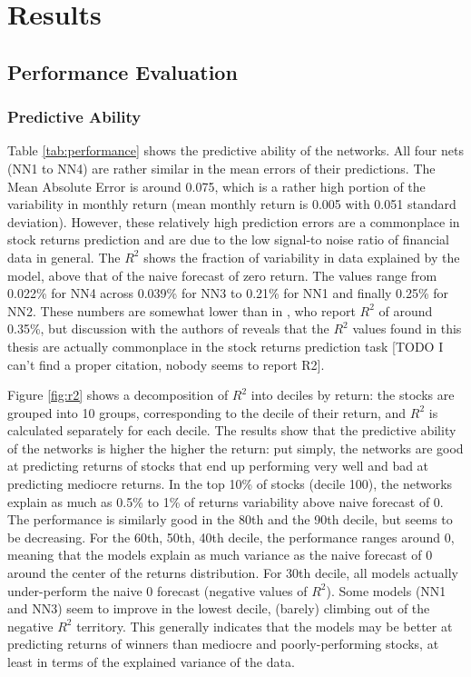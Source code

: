 \chapter{Results}
\label{chap:res}

\section{Performance Evaluation}
	
	\subsection{Predictive Ability}
	
		Table \ref{tab:performance} shows the predictive ability of the networks. All four nets (NN1 to NN4) are rather similar in the mean errors of their predictions. The Mean Absolute Error is around 0.075, which is a rather high portion of the variability in monthly return (mean monthly return is 0.005 with 0.051 standard deviation).  However, these relatively high prediction errors are a commonplace in stock returns prediction and are due to the low signal-to noise ratio of financial data in general. The $R^2$ shows the fraction of variability in data explained by the model, above that of the naive forecast of zero return. The values range from 0.022\% for NN4 across 0.039\% for NN3 to 0.21\% for NN1 and finally 0.25\% for NN2. These numbers are somewhat lower than in \cite{gu2020empirical}, who report $R^2$ of around 0.35\%, but discussion with the authors of \cite{tobek2020does} reveals that the $R^2$ values found in this thesis are actually commonplace in the stock returns prediction task [TODO I can't find a proper citation, nobody seems to report R2].    
		
		Figure \ref{fig:r2} shows a decomposition of $R^2$ into deciles by return: the stocks are grouped into 10 groups, corresponding to the decile of their return, and $R^2$ is calculated separately for each decile. The results show that the predictive ability of the networks is higher the higher the return: put simply, the networks are good at predicting returns of stocks that end up performing very well and bad at predicting mediocre returns. In the top 10\% of stocks (decile 100), the networks explain as much as  0.5\% to 1\% of returns variability above naive forecast of 0. The performance is similarly good in the 80th and the 90th decile, but seems to be decreasing. For the 60th, 50th, 40th decile, the performance ranges around 0, meaning that the models explain as much variance as the naive forecast of 0 around the center of the returns distribution. For 30th decile, all models actually under-perform the naive 0 forecast (negative values of $R^2$). Some models (NN1 and NN3) seem to improve in the lowest decile, (barely) climbing out of the negative $R^2$ territory. This generally indicates that the models may be better at predicting returns of winners than mediocre and poorly-performing stocks, at least in terms of the explained variance of the data.         
				
